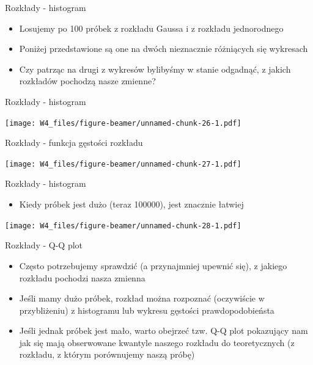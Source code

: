 \documentclass[ignorenonframetext,]{beamer}
\providecommand{\tightlist}{%
\setlength{\itemsep}{0pt}\setlength{\parskip}{0pt}}
\begin{document}
\begin{frame}{Rozkłady - histogram}

\begin{itemize}
\tightlist
\item
  Losujemy po 100 próbek z rozkładu Gaussa i z rozkładu jednorodnego
\item
  Poniżej przedstawione są one na dwóch nieznacznie różniących się
  wykresach
\item
  Czy patrząc na drugi z wykresów bylibyśmy w stanie odgadnąć, z jakich
  rozkładów pochodzą nasze zmienne?
\end{itemize}

\end{frame}

\begin{frame}{Rozkłady - histogram}

\texttt{[image: W4\_files/figure-beamer/unnamed-chunk-26-1.pdf]}

\end{frame}

\begin{frame}{Rozkłady - funkcja gęstości rozkładu}

\texttt{[image: W4\_files/figure-beamer/unnamed-chunk-27-1.pdf]}

\end{frame}

\begin{frame}{Rozkłady - histogram}

\begin{itemize}
\tightlist
\item
  Kiedy próbek jest dużo (teraz 100000), jest znacznie łatwiej
\end{itemize}

\texttt{[image: W4\_files/figure-beamer/unnamed-chunk-28-1.pdf]}

\end{frame}

\begin{frame}{Rozkłady - Q-Q plot}

\begin{itemize}
\tightlist
\item
  Często potrzebujemy sprawdzić (a przynajmniej upewnić się), z jakiego
  rozkładu pochodzi nasza zmienna
\item
  Jeśli mamy dużo próbek, rozkład można rozpoznać (oczywiście w
  przybliżeniu) z histogramu lub wykresu gęstości prawdopodobieństa
\item
  Jeśli jednak próbek jest mało, warto obejrzeć tzw. Q-Q plot pokazujący
  nam jak się mają obserwowane kwantyle naszego rozkładu do
  teoretycznych (z rozkładu, z którym porównujemy naszą próbę)
\end{itemize}

\end{frame}
\end{document}
